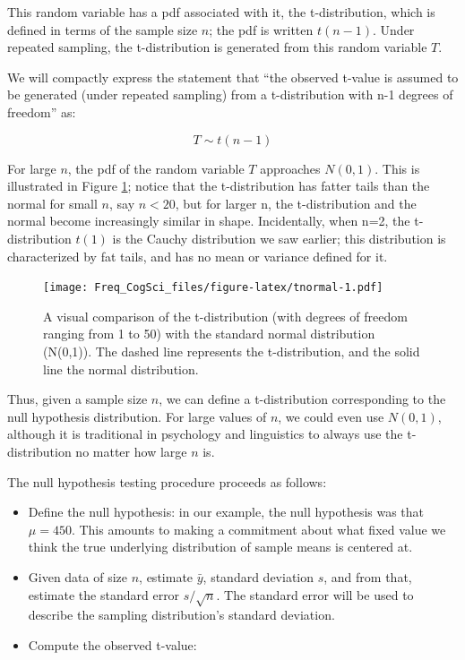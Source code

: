 \documentclass[12pt,]{krantz}
\providecommand{\tightlist}{%
  \setlength{\itemsep}{0pt}\setlength{\parskip}{0pt}}
\begin{document}
This random variable has a pdf associated with it, the t-distribution, which is defined in terms of the sample size \(n\); the pdf is written \(t(n-1)\). Under repeated sampling, the t-distribution is generated from this random variable \(T\).

We will compactly express the statement that ``the observed t-value is assumed to be generated (under repeated sampling) from a t-distribution with n-1 degrees of freedom'' as:

\begin{equation}
T \sim t(n-1)
\end{equation}

For large \(n\), the pdf of the random variable \(T\) approaches \(N(0,1)\). This is illustrated in Figure \ref{fig:tnormal}; notice that the t-distribution has fatter tails than the normal for small \(n\), say \(n<20\), but for larger n, the t-distribution and the normal become increasingly similar in shape. Incidentally, when n=2, the t-distribution \(t(1)\) is the Cauchy distribution we saw earlier; this distribution is characterized by fat tails, and has no mean or variance defined for it.

\begin{figure}
\centering
\texttt{[image: Freq\_CogSci\_files/figure-latex/tnormal-1.pdf]}
\caption{\label{fig:tnormal}A visual comparison of the t-distribution (with degrees of freedom ranging from 1 to 50) with the standard normal distribution (N(0,1)). The dashed line represents the t-distribution, and the solid line the normal distribution.}
\end{figure}

Thus, given a sample size \(n\), we can define a t-distribution corresponding to the null hypothesis distribution. For large values of \(n\), we could even use \(N(0,1)\), although it is traditional in psychology and linguistics to always use the t-distribution no matter how large \(n\) is.

The null hypothesis testing procedure proceeds as follows:

\begin{itemize}
\tightlist
\item
  Define the null hypothesis: in our example, the null hypothesis was that \(\mu = 450\). This amounts to making a commitment about what fixed value we think the true underlying distribution of sample means is centered at.
\item
  Given data of size \(n\), estimate \(\bar{y}\), standard deviation \(s\), and from that, estimate the standard error \(s/\sqrt{n}\). The standard error will be used to describe the sampling distribution's standard deviation.
\item
  Compute the observed t-value:
\end{itemize}
\end{document}
